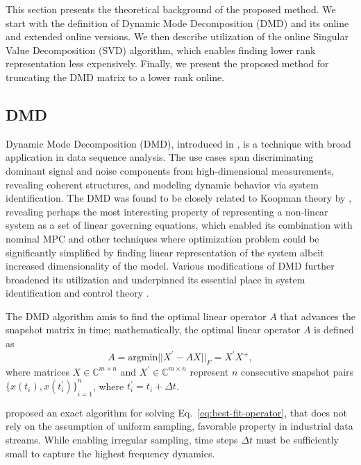 This section presents the theoretical background of the proposed method. We start with the definition of Dynamic Mode Decomposition (DMD) and its online and extended online versions. We then describe utilization of the online Singular Value Decomposition (SVD) algorithm, which enables finding lower rank representation less expensively. Finally, we present the proposed method for truncating the DMD matrix to a lower rank online.

\subsection{DMD}\label{sec:dmd}
Dynamic Mode Decomposition (DMD), introduced in \citet{Schmid2010}, is a technique with broad application in data sequence analysis. The use cases span discriminating dominant signal and noise components from high-dimensional measurements, revealing coherent structures, and modeling dynamic behavior via system identification. The DMD was found to be closely related to Koopman theory by \citet{Rowley2009}, revealing perhaps the most interesting property of representing a non-linear system as a set of linear governing equations, which enabled its combination with nominal MPC and other techniques where optimization problem could be significantly simplified by finding linear representation of the system albeit increased dimensionality of the model. Various modifications of DMD further broadened its utilization and underpinned its essential place in system identification and control theory \citep{Schmid2022}.

The DMD algorithm amis to find the optimal linear operator \(A\) that advances the snapshot matrix in time; mathematically, the optimal linear operator \(A\) is defined as
\begin{equation}\label{eq:best-fit-operator}
	A = \mathrm{argmin} ||X^\prime - AX||_F = X^\prime X^+,
\end{equation}
where matrices \(X \in \mathbb{C}^{m \times n}\) and \(X^\prime \in \mathbb{C}^{m \times n}\) represent \(n\) consecutive snapshot pairs \({\{x(t_i), x(t_i^\prime )\}}^n_{i=1}\), where \(t_i^\prime = t_i + \Delta t\).

\citet{Tu2013} proposed an exact algorithm for solving Eq.~\ref{eq:best-fit-operator}, that does not rely on the assumption of uniform sampling, favorable property in industrial data streams. While enabling irregular sampling, time steps \(\Delta t\) must be sufficiently small to capture the highest frequency dynamics.

